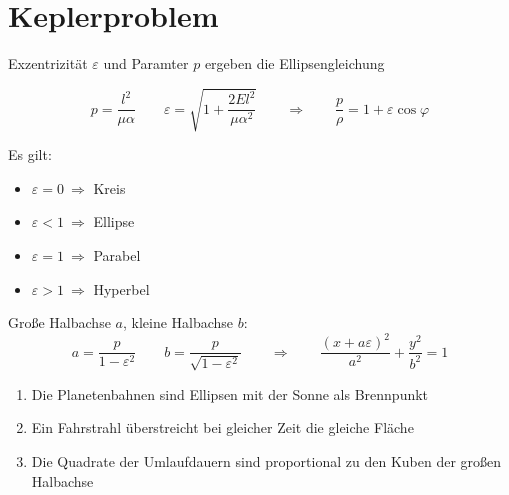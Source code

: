 \section{Keplerproblem}

\begin{frameddefn}
	
	Exzentrizität $\varepsilon$ und Paramter $p$ ergeben die Ellipsengleichung
	
	\[ p = \frac{l^2}{\mu \alpha} \qquad \varepsilon = \sqrt{1 + \frac{2 E l^2}{\mu \alpha^2}} \qquad \Rightarrow \qquad \frac{p}{\rho} = 1 + \varepsilon \cos \varphi \]
	
	Es gilt:
	\begin{itemize}
		\item $\varepsilon = 0 \ \Rightarrow$ Kreis
		\item $\varepsilon < 1 \ \Rightarrow$ Ellipse
		\item $\varepsilon = 1 \ \Rightarrow$ Parabel
		\item $\varepsilon > 1 \ \Rightarrow$ Hyperbel
	\end{itemize}
	
	Große Halbachse $a$, kleine Halbachse $b$:
	\[ a = \frac{p}{1 - \varepsilon^2} \qquad b = \frac{p}{\sqrt{1 - \varepsilon^2}} \qquad \Rightarrow \qquad \frac{(x+a\varepsilon)^2}{a^2} + \frac{y^2}{b^2} = 1\]
	
\end{frameddefn}

\begin{framedthm}
	\begin{enumerate}
		\item Die Planetenbahnen sind Ellipsen mit der Sonne als Brennpunkt
		\item Ein Fahrstrahl überstreicht bei gleicher Zeit die gleiche Fläche
		\item Die Quadrate der Umlaufdauern sind proportional zu den Kuben der großen Halbachse
	\end{enumerate}
\end{framedthm}


